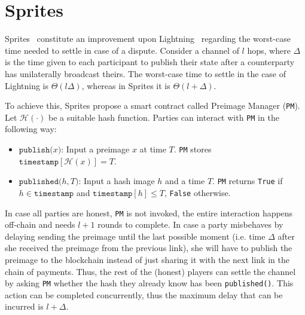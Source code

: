 \section{Sprites}
  Sprites~\cite{sprites} constitute an improvement upon Lightning~\cite{lightning}
  regarding the worst-case time needed to settle in case of a dispute. Consider a channel
  of $l$ hops, where $\Delta$ is the time given to each participant to publish their state
  after a counterparty has unilaterally broadcast theirs. The worst-case time to settle in
  the case of Lightning is $\Theta\left(l\Delta\right)$, whereas in Sprites it is
  $\Theta\left(l + \Delta\right)$.

  To achieve this, Sprites propose a smart contract called Preimage Manager (\texttt{PM}).
  Let $\mathcal{H}\left(\cdot\right)$ be a suitable hash function. Parties can interact
  with \texttt{PM} in the following way:
  \begin{itemize}
    \item $\mathtt{publish(}x\mathtt{)}$: Input a preimage $x$ at time $T$. \texttt{PM}
    stores $\mathtt{timestamp}\left[\mathcal{H}\left(x\right)\right] = T$.
    \item $\mathtt{published(}h, T\mathtt{)}$: Input a hash image $h$ and a time $T$.
    \texttt{PM} returns \texttt{True} if $h \in \mathtt{timestamp}$ and
    $\mathtt{timestamp}\left[h\right] \leq T$, \texttt{False} otherwise.
  \end{itemize}

  In case all parties are honest, \texttt{PM} is not invoked, the entire interaction
  happens off-chain and needs $l + 1$ rounds to complete. In case a party misbehaves by
  delaying sending the preimage until the last possible moment (i.e. time $\Delta$ after
  she received the preimage from the previous link), she will have to publish the preimage
  to the blockchain instead of just sharing it with the next link in the chain of
  payments. Thus, the rest of the (honest) players can settle the channel by asking
  \texttt{PM} whether the hash they already know has been \texttt{published()}. This
  action can be completed concurrently, thus the maximum delay that can be incurred is $l
  + \Delta$.
